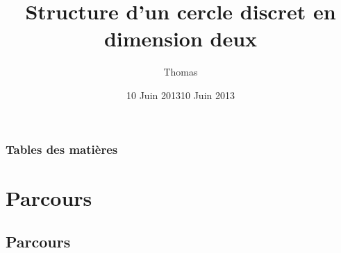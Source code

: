 \documentclass{beamer}
\title[Présentation M2Disco]{Structure d'un cercle discret en dimension deux} %
\author{\bsc{Lafond} Thomas} %
\date{10 Juin 2013}
\institute[LIRIS] %
{
  Laboratoire d'InfoRmatique en Image et Syst\`{e}mes d'information \\ %
  \medskip
  \textit{-- Présentation d'équipe : M2Disco --}\\
  \medskip
  Encadrant : \bsc{Roussillon} Tristan
}
\date{10 Juin 2013} %
\begin{document}
\begin{frame}
  \titlepage %
\end{frame}

\begin{frame}
  \frametitle{Tables des matières} %
  \setcounter{tocdepth}{1}
  \tableofcontents %
\end{frame}


\section{Parcours}

\subsection{Parcours}
 
\end{document}
